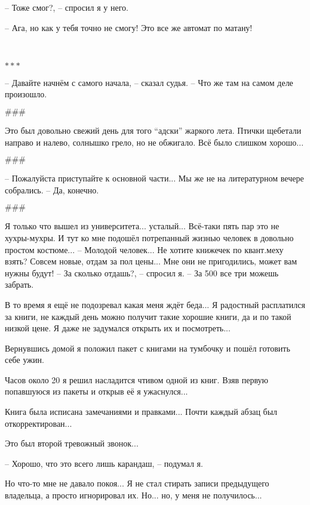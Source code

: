 -- Тоже смог?, -- спросил я у него.

-- Ага, но как у тебя точно не смогу! Это все же автомат по матану!

\
\begin{center}\( *** \)\end{center}
-- Давайте начнём с самого начала, -- сказал судья. -- Что же там на самом деле произошло.

\begin{center}\( \#\#\# \)\end{center}

Это был довольно свежий день для того ``адски'' жаркого лета. Птички щебетали направо и налево, солнышко грело, но не обжигало.
Всё было слишком хорошо...

\begin{center}\( \#\#\# \)\end{center}

-- Пожалуйста приступайте к основной части... Мы же не на литературном вечере собрались.
-- Да, конечно.

\begin{center}\( \#\#\# \)\end{center}

Я только что вышел из университета... усталый... Всё-таки пять пар это не хухры-мухры.
И тут ко мне подошёл потрепанный жизнью человек в довольно простом костюме...
-- Молодой человек... Не хотите книжечек по квант.меху взять? Совсем новые, отдам за пол цены...
Мне они не пригодились, может вам нужны будут!
-- За сколько отдашь?, -- спросил я.
-- За 500 все три можешь забрать.

В то время я ещё не подозревал какая меня ждёт беда... Я радостный расплатился за книги, не каждый день можно получит такие хорошие книги, да и по такой низкой цене. Я даже не задумался открыть их и посмотреть...

Вернувшись домой я положил пакет с книгами на тумбочку и пошёл готовить себе ужин.

Часов около 20 я решил насладится чтивом одной из книг. Взяв первую попавшуюся из пакеты и открыв её я ужаснулся...

Книга была исписана замечаниями и правками... Почти каждый абзац был откорректирован...

Это был второй тревожный звонок...

-- Хорошо, что это всего лишь карандаш, -- подумал я.

Но что-то мне не давало покоя... Я не стал стирать записи предыдущего владельца, а просто игнорировал их.
Но... но, у меня не получилось...

